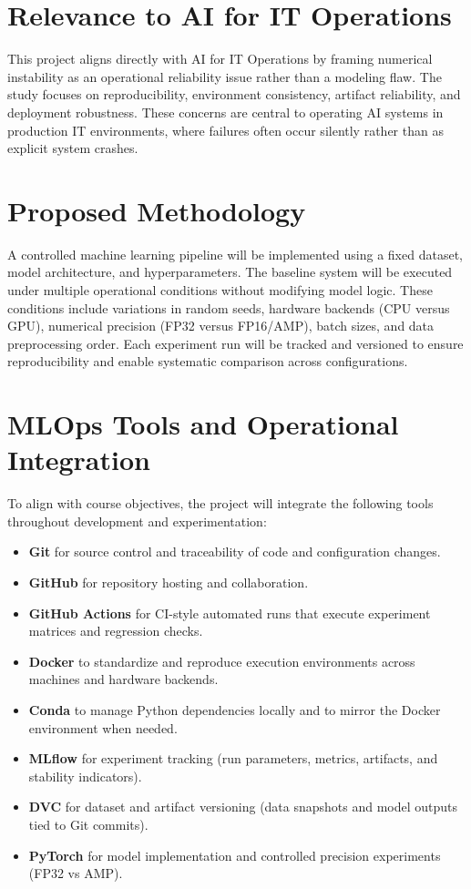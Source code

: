 \documentclass[11pt]{article}
\begin{document}
\section*{Relevance to AI for IT Operations}
This project aligns directly with AI for IT Operations by framing numerical instability as an operational reliability issue rather than a modeling flaw. The study focuses on reproducibility, environment consistency, artifact reliability, and deployment robustness. These concerns are central to operating AI systems in production IT environments, where failures often occur silently rather than as explicit system crashes.

\section*{Proposed Methodology}
A controlled machine learning pipeline will be implemented using a fixed dataset, model architecture, and hyperparameters. The baseline system will be executed under multiple operational conditions without modifying model logic. These conditions include variations in random seeds, hardware backends (CPU versus GPU), numerical precision (FP32 versus FP16/AMP), batch sizes, and data preprocessing order. Each experiment run will be tracked and versioned to ensure reproducibility and enable systematic comparison across configurations.

\section*{MLOps Tools and Operational Integration}
To align with course objectives, the project will integrate the following tools throughout development and experimentation:

\begin{itemize}
    \item \textbf{Git} for source control and traceability of code and configuration changes.
    \item \textbf{GitHub} for repository hosting and collaboration.
    \item \textbf{GitHub Actions} for CI-style automated runs that execute experiment matrices and regression checks.
    \item \textbf{Docker} to standardize and reproduce execution environments across machines and hardware backends.
    \item \textbf{Conda} to manage Python dependencies locally and to mirror the Docker environment when needed.
    \item \textbf{MLflow} for experiment tracking (run parameters, metrics, artifacts, and stability indicators).
    \item \textbf{DVC} for dataset and artifact versioning (data snapshots and model outputs tied to Git commits).
    \item \textbf{PyTorch} for model implementation and controlled precision experiments (FP32 vs AMP).
\end{itemize}
\end{document}
